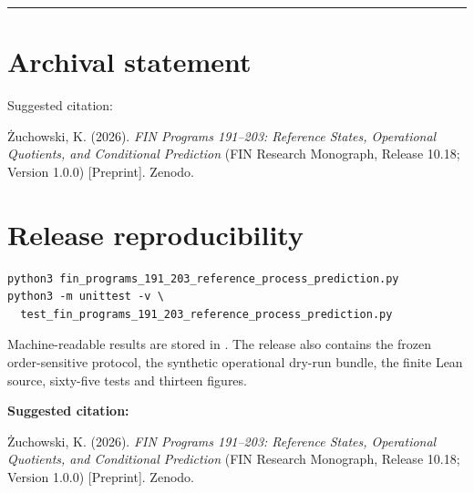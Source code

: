 \documentclass[11pt,a4paper,openany]{report}
\begin{document}
\par\medskip\hrule\medskip

\chapter{Archival statement}

Suggested citation:

\.Zuchowski, K. (2026). \emph{FIN Programs 191--203: Reference States, Operational Quotients, and Conditional Prediction} (FIN Research Monograph, Release 10.18; Version 1.0.0) [Preprint]. Zenodo.


\clearpage
\chapter*{Release reproducibility}
\begin{Verbatim}[fontsize=\small]
python3 fin_programs_191_203_reference_process_prediction.py
python3 -m unittest -v \
  test_fin_programs_191_203_reference_process_prediction.py
\end{Verbatim}

Machine-readable results are stored in
.
The release also contains the frozen order-sensitive protocol, the synthetic
operational dry-run bundle, the finite Lean source, sixty-five tests and
thirteen figures.

\medskip
\noindent\textbf{Suggested citation:}

\.Zuchowski, K. (2026). \emph{FIN Programs 191--203: Reference States,
Operational Quotients, and Conditional Prediction}
(FIN Research Monograph, Release 10.18; Version 1.0.0) [Preprint]. Zenodo.
\end{document}
